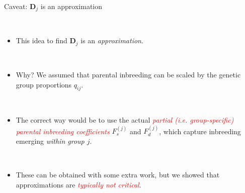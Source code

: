 \documentclass[10pt,ignorenonframetext,]{beamer}
\providecommand{\tightlist}{%
  \setlength{\itemsep}{0pt}\setlength{\parskip}{0pt}}
\begin{document}
\begin{frame}

\begin{block}{Caveat: \(\mathbf{D}_j\) is an approximation}

\(~\)

\begin{itemize}
\tightlist
\item
  This idea to find \(\mathbf{D}_j\) is an \emph{approximation}.
\end{itemize}

\(~\)

\begin{itemize}
\tightlist
\item
  Why? We assumed that parental inbreeding can be scaled by the genetic
  group proportions \(q_{ij}\).
\end{itemize}

\(~\)

\begin{itemize}
\tightlist
\item
  The correct way would be to use the actual
  \emph{\textcolor{red}{partial (i.e. group-specific) parental inbreeding coefficients}}
  \(F_s^{(j)}\) and \(F_d^{(j)}\), which capture inbreeding emerging
  \emph{within group \(j\)}.
\end{itemize}

\(~\)

\begin{itemize}
\tightlist
\item
  These can be obtained with some extra work, but we showed that
  approximations are \emph{\textcolor{red}{typically not critical}}.
\end{itemize}

\end{block}

\end{frame}
\end{document}
